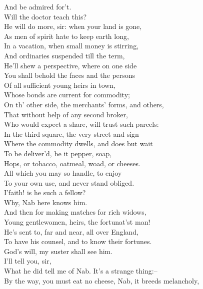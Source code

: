 \documentclass{memoir}
\begin{document}
\begin{drama*}
 And be admired for't.\\
\kastrilspeaks {} Will the doctor teach this?\\
\facespeaks  He will do more, sir: when your land is gone,\\
 As men of spirit hate to keep earth long,\\
 In a vacation, when small money is stirring,\\
 And ordinaries suspended till the term,\\
 He'll shew a perspective, where on one side\\
 You shall behold the faces and the persons\\
 Of all sufficient young heirs in town,\\
 Whose bonds are current for commodity;\\
 On th' other side, the merchants' forms, and others,\\
 That without help of any second broker,\\
 Who would expect a share, will trust such parcels:\\
 In the third square, the very street and sign\\
 Where the commodity dwells, and does but wait\\
 To be deliver'd, be it pepper, soap,\\
 Hops, or tobacco, oatmeal, woad, or cheeses.\\
 All which you may so handle, to enjoy\\
 To your own use, and never stand obliged.\\
\kastrilspeaks  I'faith! is he such a fellow?\\
\facespeaks {} Why, Nab here knows him.\\
 And then for making matches for rich widows,\\
 Young gentlewomen, heirs, the fortunat'st man!\\
 He's sent to, far and near, all over England,\\
 To have his counsel, and to know their fortunes.\\
\kastrilspeaks  God's will, my suster shall see him.\\
\facespeaks {} I'll tell you, sir,\\
 What he did tell me of Nab. It's a strange thing:--\\
 By the way, you must eat no cheese, Nab, it breeds melancholy,\\

\end{drama*}
\end{document}
